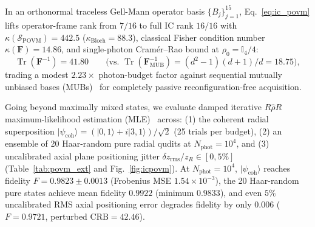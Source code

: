 \documentclass{optica-article}
\newcommand{\ket}[1]{\lvert #1 \rangle}
\begin{document}
In an orthonormal traceless Gell-Mann operator basis $\{B_j\}_{j=1}^{15}$, Eq.~\eqref{eq:ic_povm} lifts operator-frame rank from $7/16$ to full IC rank $16/16$ with $\kappa(\mathcal{S}_{\mathrm{POVM}}) = 442.5$ ($\kappa_{\mathrm{Bloch}} = 88.3$), classical Fisher condition number $\kappa(\mathbf{F}) = 14.86$, and single-photon Cram\'er--Rao bound at $\rho_0 = \mathbb{I}_4/4$:
\begin{equation}
  \operatorname{Tr}\!\left(\mathbf{F}^{-1}\right) = 41.80 \qquad \bigl(\text{vs.\ } \operatorname{Tr}(\mathbf{F}_{\mathrm{MUB}}^{-1}) = (d^2-1)(d+1)/d = 18.75\bigr),
  \label{eq:crb_povm}
\end{equation}
trading a modest $2.23\times$ photon-budget factor against sequential mutually unbiased bases (MUBs)~\cite{WoottersFields1989} for completely passive reconfiguration-free acquisition.

Going beyond maximally mixed states, we evaluate damped iterative $R\hat{\rho}R$ maximum-likelihood estimation (MLE)~\cite{Lvovsky2004} across: (1) the coherent radial superposition $\ket{\psi_{\mathrm{coh}}} = (\ket{0,1}+i\ket{3,1})/\sqrt{2}$ (25 trials per budget), (2) an ensemble of 20 Haar-random pure radial qudits at $N_{\mathrm{phot}} = 10^4$, and (3) uncalibrated axial plane positioning jitter $\delta z_{\mathrm{rms}}/z_R \in [0, 5\%]$ (Table~\ref{tab:povm_ext} and Fig.~\ref{fig:icpovm}). At $N_{\mathrm{phot}} = 10^4$, $\ket{\psi_{\mathrm{coh}}}$ reaches fidelity $F = 0.9823 \pm 0.0013$ (Frobenius MSE $1.54\times 10^{-3}$), the 20 Haar-random pure states achieve mean fidelity $0.9922$ (minimum $0.9833$), and even $5\%$ uncalibrated RMS axial positioning error degrades fidelity by only $0.006$ ($F = 0.9721$, perturbed $\mathrm{CRB} = 42.46$).
\end{document}
